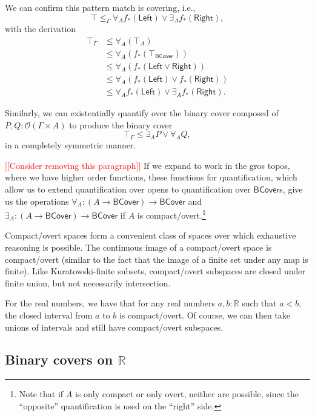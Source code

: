 \documentclass[conference]{IEEEtran}
\newcommand{\R}{\mathbb{R}}
\newcommand{\Open}[1]{\mathcal{O}({#1})}
\newcommand{\note}[1]{\textcolor{red}{[[{#1}]]}}
\begin{document}
We can confirm this pattern match is covering, i.e.,
\[
\top \le_\Gamma \forall_A f_*(\mathsf{Left}) \vee \exists_A f_*(\mathsf{Right}),
\]
with the derivation
\begin{align*}
\top_\Gamma 
  &\le \forall_A (\top_A) \tag{$\forall_A$ adjointness}
\\ &\le \forall_A (f_*(\top_\mathsf{BCover})) \tag{$f_*$ preserves $\top$}
\\ &\le \forall_A (f_*(\mathsf{Left} \vee \mathsf{Right}))
\\ &\le \forall_A(f_*(\mathsf{Left}) \vee f_*(\mathsf{Right}))  \tag{$f_*$ preserves joins}
\\ &\le \forall_A f_*(\mathsf{Left}) \vee \exists_A f_*(\mathsf{Right}) \tag{$A$ is compact/overt}.
\end{align*}

Similarly, we can existentially quantify over the binary cover composed of $P, Q : \Open{\Gamma \times A}$ to produce the binary cover
\[
\top_\Gamma \le \exists_A P \vee \forall_A Q,
\]
in a completely symmetric manner.

\note{Consider removing this paragraph} If we expand to work in the gros topos, where we have higher order functions, these functions for quantification, which allow us to extend quantification over opens to quantification over $\mathsf{BCover}$s, give us the operations $\forall_A : (A \to \mathsf{BCover}) \to \mathsf{BCover}$ and $\exists_A : (A \to \mathsf{BCover}) \to \mathsf{BCover}$ if $A$ is compact/overt.\footnote{Note that if $A$ is only compact or only overt, neither are possible, since the ``opposite'' quantification is used on the ``right'' side.}

Compact/overt spaces form a convenient class of spaces over which exhaustive reasoning is possible. The continuous image of a compact/overt space is compact/overt (similar to the fact that the image of a finite set under any map is finite). Like Kuratowski-finite subsets, compact/overt subspaces are closed under finite union, but not necessarily intersection.

For the real numbers, we have that for any real numbers $a, b : \R$ such that $a < b$, the closed interval from $a$ to $b$ is compact/overt. Of course, we can then take unions of intervals and still have compact/overt subspaces.

\subsection{Binary covers on $\R$}
\end{document}

